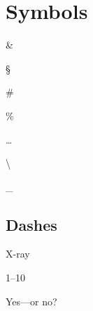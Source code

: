 \chapter{Symbols}

\&

\S

\#

\%

\ldots

\textbar

\textbullet 

\textbackslash

\rightarrow

\Rightarrow

\faArrowRight     %

\leftrightarrow

\Leftrightarrow

\faArrowsH        %

\_

\section{Dashes}

X-ray

1--10

Yes---or no?
